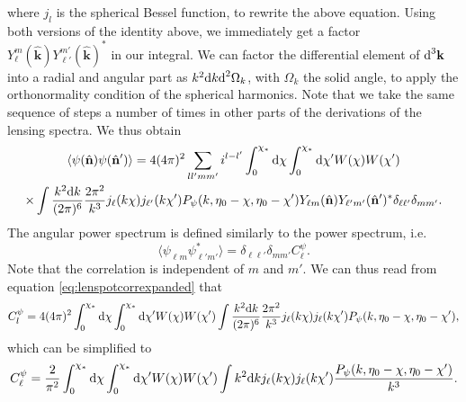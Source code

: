 \documentclass[11pt]{article} %
\DeclareRobustCommand{\d}{\ifmmode\text{d}\else d\fi}
\begin{document}
where $j_l$ is the spherical Bessel function, to rewrite the above equation. Using both versions of the identity above, we immediately get a factor $Y_\ell^m(\hat{\mathbf k})Y_{\ell'}^{m'}(\hat{\mathbf k})^*$ in our integral. We can factor the differential element of $\d^3\mathbf k$ into a radial and angular part as $k^2\d k\d^2\Omega_k$, with $\Omega_k$ the solid angle, to apply the orthonormality condition of the spherical harmonics. Note that we take the same sequence of steps a number of times in other parts of the derivations of the lensing spectra. We thus obtain
\begin{gather}
    \langle \psi(\hat{\mathbf n})\psi(\hat{\mathbf n}') \rangle = 4(4\pi)^2\sum_{ll'mm'}i^{l-l'}\int_0^{\chi_*}\d \chi\int_0^{\chi_*}\d \chi' W(\chi)W(\chi')\\\times\int \frac{k^2\d k}{(2\pi)^6}\frac{2\pi^2}{k^3}j_\ell(k\chi)j_{\ell'}(k\chi')P_\psi(k,\eta_0 - \chi, \eta_0-\chi')Y_{\ell m}(\hat{\mathbf n})Y_{\ell'm'}(\hat{\mathbf n}')^*\delta_{\ell \ell'}\delta_{mm'}. \label{eq:lenspotcorrexpanded}
\end{gather}
The angular power spectrum is defined similarly to the power spectrum, i.e.
\begin{equation}
    \langle \psi_{\ell m}\psi_{\ell'm'}^* \rangle = \delta_{\ell \ell'}\delta_{mm'}C_\ell^\psi.
\end{equation}
Note that the correlation is independent of $m$ and $m'$. %
We can thus read from equation \ref{eq:lenspotcorrexpanded} that
\begin{gather}
    C_l^\psi = 4(4\pi)^2\int_0^{\chi_*}\d \chi\int_0^{\chi_*}\d \chi' W(\chi)W(\chi')\int \frac{k^2\d k}{(2\pi)^6}\frac{2\pi^2}{k^3}j_\ell(k\chi)j_{\ell}(k\chi')P_\psi(k,\eta_0 - \chi, \eta_0-\chi'),
\end{gather}
which can be simplified to
\begin{gather}
    C_\ell^\psi = \frac{2}{\pi^2}\int_0^{\chi_*}\d \chi\int_0^{\chi_*}\d \chi' W(\chi)W(\chi')\int k^2\d kj_\ell(k\chi)j_{\ell}(k\chi')\frac{P_\psi(k,\eta_0 - \chi, \eta_0-\chi')}{k^3}.
\end{gather}
\end{document}
